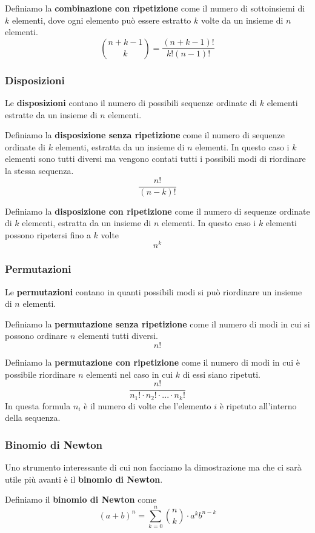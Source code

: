 \begin{definition}
	Definiamo la \textbf{combinazione con ripetizione} come il numero di sottoinsiemi di $k$ elementi,
	dove ogni elemento può essere estratto $k$ volte da un insieme di $n$ elementi.
	\[ \binom{n+k-1}{k} = \frac{(n + k - 1)!}{k! (n-1)!} \]
\end{definition}

\subsubsection{Disposizioni}
Le \textbf{disposizioni} contano il numero di possibili sequenze ordinate di $k$ elementi estratte da 
un insieme di $n$ elementi.

\begin{definition}
	Definiamo la \textbf{disposizione senza ripetizione} come il numero di sequenze ordinate di $k$
	elementi, estratta da un insieme di $n$ elementi. In questo caso i $k$ elementi sono tutti diversi
	ma vengono contati tutti i possibili modi di riordinare la stessa sequenza.
	\[ \frac{n!}{(n - k)!} \]
\end{definition}

\begin{definition}
	Definiamo la \textbf{disposizione con ripetizione} come il numero di sequenze ordinate di $k$
	elementi, estratta da un insieme di $n$ elementi. In questo caso i $k$ elementi possono ripetersi
	fino a $k$ volte
	\[ n^k \]
\end{definition}

\subsubsection{Permutazioni}
Le \textbf{permutazioni} contano in quanti possibili modi si può riordinare un insieme di $n$ elementi.

\begin{definition}
	Definiamo la \textbf{permutazione senza ripetizione} come il numero di modi in cui si possono ordinare
	$n$ elementi tutti diversi.
	\[ n! \]
\end{definition}

\begin{definition}
	Definiamo la \textbf{permutazione con ripetizione} come il numero di modi in cui è possibile riordinare
	$n$ elementi nel caso in cui $k$ di essi siano ripetuti.
	\[ \frac{n!}{n_1! \cdot n_2! \cdot ... \cdot n_k!} \]
	In questa formula $n_i$ è il numero di volte che l'elemento $i$ è ripetuto all'interno della sequenza.
\end{definition}

\subsubsection{Binomio di Newton}
Uno strumento interessante di cui non facciamo la dimostrazione ma che ci sarà utile più avanti è il
\textbf{binomio di Newton}.

\begin{definition}
	Definiamo il \textbf{binomio di Newton} come
	\[ (a + b)^n = \sum_{k=0}^n \binom{n}{k} \cdot a^k b^{n-k} \]
\end{definition}

